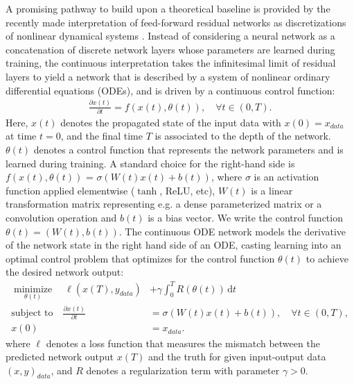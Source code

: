 \documentclass[12pt]{amsart}
\def\minimize{\operatorname*{minimize}}
\begin{document}
A promising pathway to build upon a theoretical baseline is provided by the recently made interpretation of feed-forward residual networks as discretizations of nonlinear dynamical systems \cite{weinan2017proposal, benning2019deep}.
Instead of considering a neural network as a concatenation of discrete network layers whose parameters are learned during training, the continuous interpretation takes the infinitesimal limit of residual layers to yield a network that is described by a system of nonlinear ordinary differential equations (ODEs), and is driven by a continuous control function:
\begin{align}\label{eq:odenet}
  \frac{\partial x(t)}{\partial t} = f(x(t), \theta(t)), \quad \forall t\in (0,T).
\end{align}
Here, $x(t)$ denotes the propagated state of the input data with $x(0) = x_{data}$ at time $t=0$, and the final time $T$ is associated to the depth of the network. $\theta(t)$ denotes a control function that represents the network parameters and is learned during training.
A standard choice for the right-hand side is $f(x(t), \theta(t))$ =  $\sigma(W(t)x(t)+b(t))$, where $\sigma$ is an activation function applied elementwise ($\tanh$, ReLU, etc), $W(t)$ is a linear transformation matrix representing e.g. a dense parameterized matrix or a convolution operation and $b(t)$ is a bias vector.
We write the control function $\theta(t)=(W(t),b(t))$.
The continuous ODE network models the derivative of the network state in the right hand side of an ODE, casting learning into an optimal control problem that optimizes for the control function $\theta(t)$ to achieve the desired network output:
\begin{align} \label{eq:minloss}
  \minimize_{\theta(t)} \quad  \ell(x(T), y_{data})& + \gamma\int_0^T R(\theta(t)) \, \mathrm{d}t \\
  \text{subject to} \quad
  \frac{\partial x(t)}{\partial t} &= \sigma(W(t)x(t) + b(t)), \quad \forall t\in (0,T), \label{eq:ode}\\
  x(0) &= x_{data}.
\end{align}
where $\ell$ denotes a loss function that measures the mismatch between the predicted network output $x(T)$ and the truth for given input-output data $(x,y)_{data}$, and $R$ denotes a regularization term with parameter $\gamma>0$.
\end{document}
